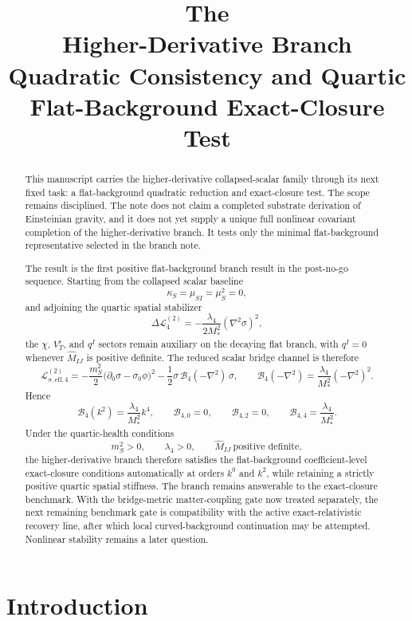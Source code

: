 \documentclass[11pt]{article}
\title{\textbf{The \TheoryName{}}\\[0.4em]
\large Higher-Derivative Branch Quadratic Consistency and Quartic Flat-Background Exact-Closure Test}
\author{}
\date{}
\begin{document}
\maketitle

\begin{abstract}
This manuscript carries the higher-derivative collapsed-scalar family through its next fixed task: a flat-background quadratic reduction and exact-closure test. The scope remains disciplined. The note does not claim a completed substrate derivation of Einsteinian gravity, and it does not yet supply a unique full nonlinear covariant completion of the higher-derivative branch. It tests only the minimal flat-background representative selected in the branch note.

The result is the first positive flat-background branch result in the post-no-go sequence. Starting from the collapsed scalar baseline
\[
\kappa_S=\mu_{SI}=\mu_S^2=0,
\]
and adjoining the quartic spatial stabilizer
\[
\Delta\mathcal L_4^{(2)}
=
-\frac{\lambda_4}{2M_*^2}(\nabla^2\sigma)^2,
\]
the \(\chi\), \(V_T^i\), and \(q^I\) sectors remain auxiliary on the decaying flat branch, with \(q^I=0\) whenever \(\widehat M_{IJ}\) is positive definite. The reduced scalar bridge channel is therefore
\[
\mathcal L_{\sigma,\mathrm{eff},4}^{(2)}
=
-\frac{m_S^2}{2}\bigl(\partial_0\sigma-\sigma_0\phi\bigr)^2
-\frac{1}{2}\sigma\,\mathcal B_4(-\nabla^2)\,\sigma,
\qquad
\mathcal B_4(-\nabla^2)=\frac{\lambda_4}{M_*^2}(-\nabla^2)^2.
\]
Hence
\[
\mathcal B_4(k^2)=\frac{\lambda_4}{M_*^2}k^4,
\qquad
\mathcal B_{4,0}=0,
\qquad
\mathcal B_{4,2}=0,
\qquad
\mathcal B_{4,4}=\frac{\lambda_4}{M_*^2}.
\]
Under the quartic-health conditions
\[
m_S^2>0,
\qquad
\lambda_4>0,
\qquad
\widehat M_{IJ}\ \text{positive definite},
\]
the higher-derivative branch therefore satisfies the flat-background coefficient-level exact-closure conditions automatically at orders \(k^0\) and \(k^2\), while retaining a strictly positive quartic spatial stiffness. The branch remains answerable to the exact-closure benchmark. With the bridge-metric matter-coupling gate now treated separately, the next remaining benchmark gate is compatibility with the active exact-relativistic recovery line, after which local curved-background continuation may be attempted. Nonlinear stability remains a later question.
\end{abstract}

\section{Introduction}
\end{document}
